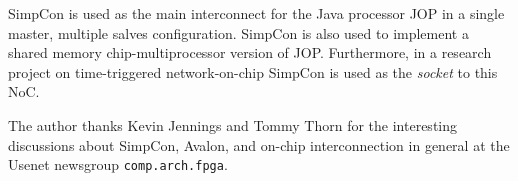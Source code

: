 \documentclass[a4paper,12pt]{scrartcl}
\begin{document}
SimpCon is used as the main interconnect for the Java processor JOP
in a single master, multiple salves configuration. SimpCon is also
used to implement a shared memory chip-multiprocessor version of JOP.
Furthermore, in a research project on time-triggered network-on-chip
\cite{jop:ttnoc} SimpCon is used as the \emph{socket} to this NoC.

The author thanks Kevin Jennings and Tommy Thorn for the interesting
discussions about SimpCon, Avalon, and on-chip interconnection in
general at the Usenet newsgroup \texttt{comp.arch.fpga}.



\end{document}
